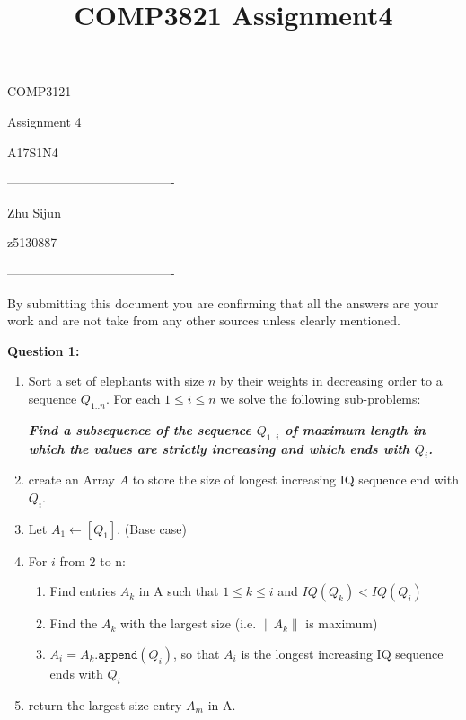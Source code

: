 \documentclass{article}
\title{COMP3821 Assignment4}
\begin{document}
\begin{LARGE}
  \begin{center}

    COMP3121

    Assignment 4

    A17S1N4

    ----------------------------------------

    Zhu Sijun

    z5130887

    ----------------------------------------

    By submitting this document you are confirming that all the answers are your work and are not take from any other sources unless clearly mentioned.

  \end{center}
\end{LARGE}

\textbf{Question 1:}

\begin{enumerate}
\item Sort a set of elephants with size $n$ by their weights in decreasing order to a sequence $Q _{ 1 .. n}$.
  For each $1\leq i \leq n$ we solve the following sub-problems:

  \textbf{\textit{Find a subsequence of the sequence $Q_{1 ..i}$ of maximum length in which the values are strictly increasing and which ends with $Q_i$.}}

\item create an Array $A$ to store the size of longest increasing IQ sequence end with $Q_i$.
\item  Let $A_1 \leftarrow [Q_1]$. (Base case)
\item For $i$ from 2 to n:
  \begin{enumerate}
  \item Find entries $A_k$ in A such that $1 \leq k \leq i$ and $IQ(Q_k) < IQ(Q_i)$
  \item Find the $A_k$ with the largest size (i.e. $\| A_k \|$ is maximum)
  \item $A_i = A_k\texttt{.append}(Q_i)$, so that $A_i$ is the longest increasing IQ sequence ends with $Q_i$
  \end{enumerate}
\item return the largest size entry $A_m$ in A.
\end{enumerate}
\end{document}
